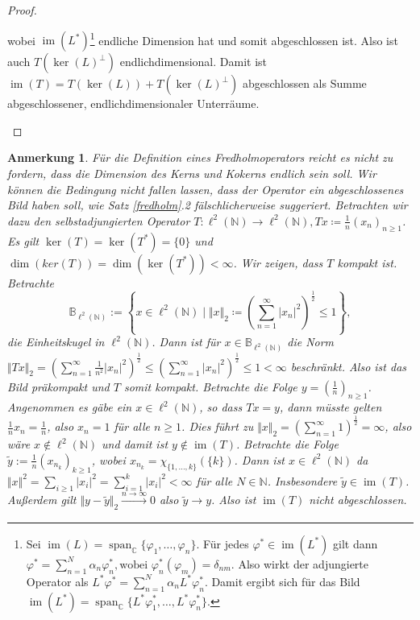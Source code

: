 \documentclass[11pt, hidelinks]{article}
\newcommand{\im}{\operatorname{im}}
\numberwithin{conj}{section}
\newtheorem{remark}[conj]{Anmerkung}
\begin{document}
\begin{proof}
\begin{itemize}
    wobei $\im(L^\ast)$\footnote{Sei $\im(L) = \operatorname{span}_\mathbb{C}\{\varphi_1, \dots, \varphi_n\}$. Für jedes \( \varphi^\ast \in \im(L^\ast) \) gilt dann $\varphi^\ast = \sum_{n=1}^N \alpha_n \varphi_n^\ast, \text{wobei } \varphi_n^\ast(\varphi_m) = \delta_{nm}$. Also wirkt der adjungierte Operator als $L^\ast \varphi^\ast = \sum_{n=1}^N \alpha_n L^\ast \varphi_n^\ast$. Damit ergibt sich für das Bild \( \im(L^\ast) = \operatorname{span}_{\mathbb{C}}\{L^\ast \varphi_1^\ast, \dots, L^\ast \varphi_n^\ast\} \).} endliche Dimension hat und somit abgeschlossen ist. Also ist auch $T(\ker(L)^\perp)$ endlichdimensional. Damit ist $\im(T) = T(\ker(L)) + T(\ker(L)^\perp)$ abgeschlossen als Summe abgeschlossener, endlichdimensionaler Unterräume.
\end{itemize}
\end{proof}

\begin{remark}
Für die Definition eines Fredholmoperators reicht es nicht zu fordern, dass die Dimension des Kerns und Kokerns endlich sein soll. Wir können die Bedingung nicht fallen lassen, dass der Operator ein abgeschlossenes Bild haben soll, wie Satz \ref{fredholm}.2 fälschlicherweise suggeriert. Betrachten wir dazu den selbstadjungierten Operator $T: \ell^2(\mathbb{N}) \to \ell^2(\mathbb{N}), Tx \coloneq \frac{1}{n} (x_n)_{n \geq 1}$. Es gilt $\ker(T) = \ker(T^\ast) = \{0\}$ und $\dim(ker(T)) = \dim(\ker(T^\ast)) < \infty$. Wir zeigen, dass $T$ kompakt ist. Betrachte $$\mathbb{B}_{\ell^2(\mathbb{N})} := \left\{ x \in \ell^2(\mathbb{N}) \; \bigg\vert \; \Vert x \Vert_2 \coloneq \left(\sum_{n=1}^{\infty} \vert x_n \vert^2\right)^{\frac{1}{2}} \leq 1 \right\},$$ die Einheitskugel in $\ell^2(\mathbb{N})$. Dann ist für $x \in \mathbb{B}_{\ell^2(\mathbb{N})}$ die Norm $\Vert Tx \Vert_2 = (\sum_{n=1}^\infty \frac{1}{n^2} \vert x_n \vert^2)^\frac{1}{2} \leq (\sum_{n=1}^\infty \vert x_n \vert^2)^\frac{1}{2} \leq 1 < \infty$ beschränkt. Also ist das Bild präkompakt und $T$ somit kompakt. Betrachte die Folge $y = (\frac{1}{n})_{n \geq 1}$. Angenommen es gäbe ein $x \in \ell^2(\mathbb{N})$, so dass $Tx = y$, dann müsste gelten $\frac{1}{n} x_n = \frac{1}{n}$, also $x_n = 1$ für alle $n \geq 1$. Dies führt zu $\Vert x \Vert_2 = \left( \sum_{n=1}^{\infty} 1 \right)^\frac{1}{2} = \infty$, also wäre $x \notin \ell^2(\mathbb{N})$ und damit ist $y \notin \im(T)$. Betrachte die Folge $\widetilde{y} := \frac{1}{n} (x_{n_k})_{k \geq 1}$, wobei \( x_{n_k} = \chi_{\{1, \ldots, k\}}(\{k\})\). Dann ist $x \in \ell^2(\mathbb{N})$ da \( \Vert x \Vert^2 = \sum_{i \geq 1} \vert x_i \vert^2 = \sum_{i=1}^{k} \vert x_i \vert^2 < \infty\) für alle \( N \in \mathbb{N} \). Insbesondere $\widetilde{y} \in \im(T)$. Außerdem gilt $\Vert y - \widetilde{y} \Vert_2 \xrightarrow[]{n \to \infty} 0$ also $\widetilde{y} \to y$. Also ist $\im(T)$ nicht abgeschlossen.
\end{remark}
\end{document}
